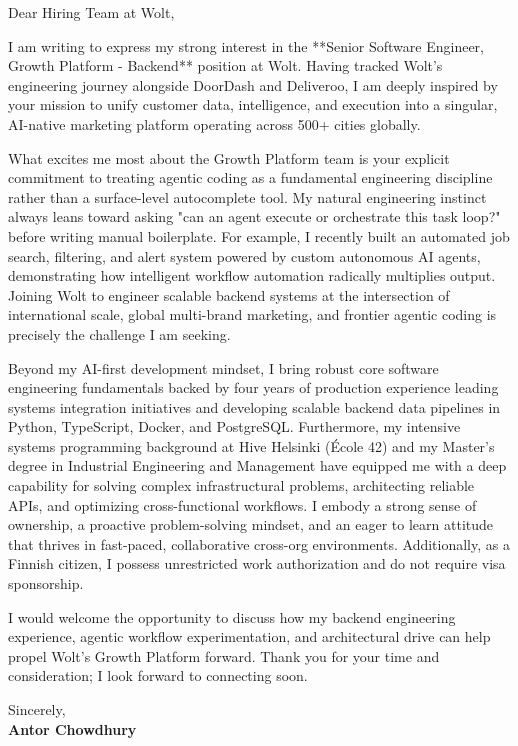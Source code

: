 \documentclass[a4paper,11pt]{article}
\begin{document}
\begin{justify}
Dear Hiring Team at Wolt,

I am writing to express my strong interest in the **Senior Software Engineer, Growth Platform - Backend** position at Wolt. Having tracked Wolt’s engineering journey alongside DoorDash and Deliveroo, I am deeply inspired by your mission to unify customer data, intelligence, and execution into a singular, AI-native marketing platform operating across 500+ cities globally.

What excites me most about the Growth Platform team is your explicit commitment to treating agentic coding as a fundamental engineering discipline rather than a surface-level autocomplete tool. My natural engineering instinct always leans toward asking "can an agent execute or orchestrate this task loop?" before writing manual boilerplate. For example, I recently built an automated job search, filtering, and alert system powered by custom autonomous AI agents, demonstrating how intelligent workflow automation radically multiplies output. Joining Wolt to engineer scalable backend systems at the intersection of international scale, global multi-brand marketing, and frontier agentic coding is precisely the challenge I am seeking.

Beyond my AI-first development mindset, I bring robust core software engineering fundamentals backed by four years of production experience leading systems integration initiatives and developing scalable backend data pipelines in Python, TypeScript, Docker, and PostgreSQL. Furthermore, my intensive systems programming background at Hive Helsinki (École 42) and my Master’s degree in Industrial Engineering and Management have equipped me with a deep capability for solving complex infrastructural problems, architecting reliable APIs, and optimizing cross-functional workflows. I embody a strong sense of ownership, a proactive problem-solving mindset, and an eager to learn attitude that thrives in fast-paced, collaborative cross-org environments. Additionally, as a Finnish citizen, I possess unrestricted work authorization and do not require visa sponsorship.

I would welcome the opportunity to discuss how my backend engineering experience, agentic workflow experimentation, and architectural drive can help propel Wolt's Growth Platform forward. Thank you for your time and consideration; I look forward to connecting soon.

\vspace{16pt}

\noindent Sincerely, \\[8pt]
\textbf{Antor Chowdhury}
\end{justify}
\end{document}
